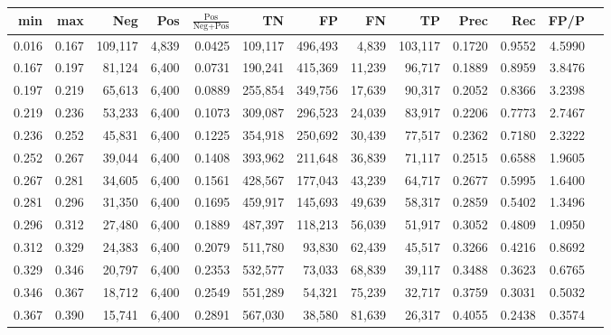 \begin{tabular}{rrrrrrrrrrrrr}
\toprule
  min &   max &     Neg &   Pos & $\frac{\text{Pos}}{\text{Neg}+\text{Pos}}$ &      TN &      FP &      FN &      TP &   Prec &    Rec &   FP/P \\
\midrule
0.016 & 0.167 & 109,117 & 4,839 &                                     0.0425 & 109,117 & 496,493 &   4,839 & 103,117 & 0.1720 & 0.9552 & 4.5990 \\
0.167 & 0.197 &  81,124 & 6,400 &                                     0.0731 & 190,241 & 415,369 &  11,239 &  96,717 & 0.1889 & 0.8959 & 3.8476 \\
0.197 & 0.219 &  65,613 & 6,400 &                                     0.0889 & 255,854 & 349,756 &  17,639 &  90,317 & 0.2052 & 0.8366 & 3.2398 \\
0.219 & 0.236 &  53,233 & 6,400 &                                     0.1073 & 309,087 & 296,523 &  24,039 &  83,917 & 0.2206 & 0.7773 & 2.7467 \\
0.236 & 0.252 &  45,831 & 6,400 &                                     0.1225 & 354,918 & 250,692 &  30,439 &  77,517 & 0.2362 & 0.7180 & 2.3222 \\
0.252 & 0.267 &  39,044 & 6,400 &                                     0.1408 & 393,962 & 211,648 &  36,839 &  71,117 & 0.2515 & 0.6588 & 1.9605 \\
0.267 & 0.281 &  34,605 & 6,400 &                                     0.1561 & 428,567 & 177,043 &  43,239 &  64,717 & 0.2677 & 0.5995 & 1.6400 \\
0.281 & 0.296 &  31,350 & 6,400 &                                     0.1695 & 459,917 & 145,693 &  49,639 &  58,317 & 0.2859 & 0.5402 & 1.3496 \\
0.296 & 0.312 &  27,480 & 6,400 &                                     0.1889 & 487,397 & 118,213 &  56,039 &  51,917 & 0.3052 & 0.4809 & 1.0950 \\
0.312 & 0.329 &  24,383 & 6,400 &                                     0.2079 & 511,780 &  93,830 &  62,439 &  45,517 & 0.3266 & 0.4216 & 0.8692 \\
0.329 & 0.346 &  20,797 & 6,400 &                                     0.2353 & 532,577 &  73,033 &  68,839 &  39,117 & 0.3488 & 0.3623 & 0.6765 \\
0.346 & 0.367 &  18,712 & 6,400 &                                     0.2549 & 551,289 &  54,321 &  75,239 &  32,717 & 0.3759 & 0.3031 & 0.5032 \\
0.367 & 0.390 &  15,741 & 6,400 &                                     0.2891 & 567,030 &  38,580 &  81,639 &  26,317 & 0.4055 & 0.2438 & 0.3574 \\

\end{tabular}
